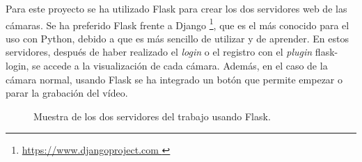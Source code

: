 Para este proyecto se ha utilizado Flask para crear los dos servidores web de las cámaras. Se ha preferido Flask frente a Django \footnote{\url{https://www.djangoproject.com }}, que es el más conocido para el uso con Python, debido a que es más sencillo de utilizar y de aprender. En estos servidores, después de haber realizado el \textit{login} o el registro con el \textit{plugin} flask-login, se accede a la visualización de cada cámara. Además, en el caso de la cámara normal, usando Flask se ha integrado un botón que permite empezar o parar la grabación del vídeo. \\
\begin{figure}[h!]
  \begin{center}
    \hspace{8mm}
  \end{center}
\caption{Muestra de los dos servidores del trabajo usando Flask.} \label{fig:servers}
\end{figure}

